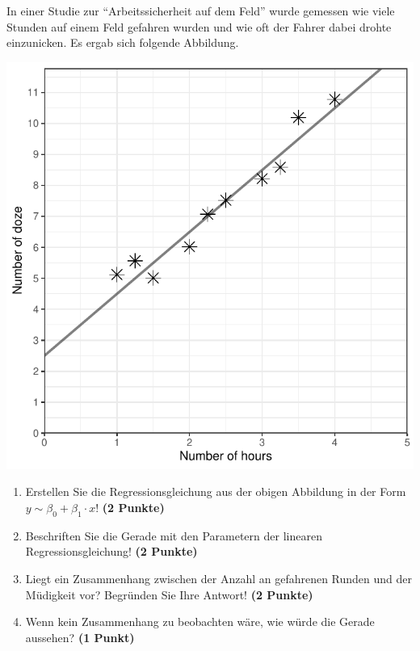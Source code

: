 \documentclass[a4paper, 10pt]{scrartcl}\usepackage[]{graphicx}\usepackage[]{xcolor}
\makeatletter
\def\maxwidth{ %
  \ifdim\Gin@nat@width>\linewidth
    \linewidth
  \else
    \Gin@nat@width
  \fi
}
\makeatother
\begin{document}
In einer Studie zur "`Arbeitssicherheit auf dem Feld"' wurde gemessen wie viele
Stunden auf einem Feld gefahren wurden und wie oft der Fahrer dabei drohte
einzunicken. Es ergab sich folgende Abbildung. 



{\centering \includegraphics[width=\maxwidth]{img/scatter-02-1} 

}




\begin{enumerate}
\item Erstellen Sie die Regressionsgleichung aus der obigen Abbildung in
  der Form $y \sim \beta_0 + \beta_1 \cdot x$! \textbf{(2 Punkte)}
\item Beschriften Sie die Gerade mit den Parametern der linearen
  Regressionsgleichung! \textbf{(2 Punkte)}
\item Liegt ein Zusammenhang zwischen der Anzahl an gefahrenen Runden und
  der M{\"u}digkeit vor? Begr{\"u}nden Sie Ihre Antwort! \textbf{(2 Punkte)}
\item Wenn kein Zusammenhang zu beobachten w{\"a}re, wie w{\"u}rde die Gerade aussehen? \textbf{(1 Punkt)}
\end{enumerate} 
\clearpage
\end{document}

